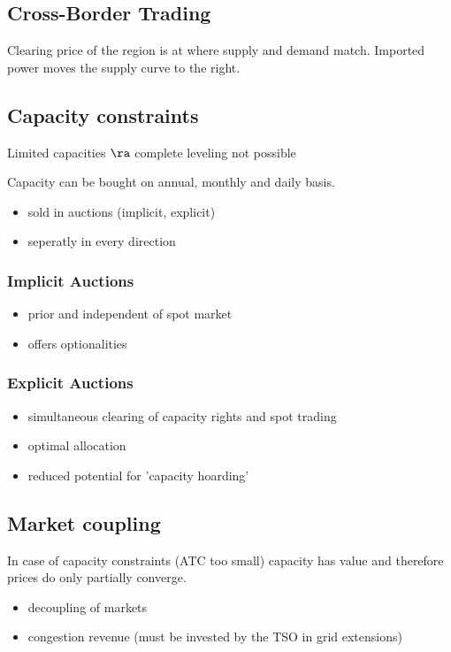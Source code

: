 \documentclass[fs, footer]{latex4ei}
\begin{document}
\begin{multicols*}{4}
\section{Cross-Border Trading}

Clearing price of the region is at where supply and demand match. Imported power moves the supply curve to the right.

\subsection{Capacity constraints}
Limited capacities $\ra$ complete leveling not possible

Capacity can be bought on annual, monthly and daily basis.
\begin{itemize}
	\item sold in auctions (implicit, explicit)
	\item seperatly in every direction
\end{itemize}

\subsubsection{Implicit Auctions}
\begin{itemize}
	\item prior and independent of spot market
	\item offers optionalities
\end{itemize}
\subsubsection{Explicit Auctions}  
\begin{itemize}
	\item simultaneous clearing of capacity rights and spot trading
	\item optimal allocation
	\item reduced potential for 'capacity hoarding'
\end{itemize}

\subsection{Market coupling}
In case of capacity constraints (ATC too small) capacity has value and therefore prices do only partially converge. 
\begin{itemize}
	\item decoupling of markets
	\item congestion revenue (must be invested by the TSO in grid extensions)
\end{itemize}


\end{multicols*}
\end{document}

